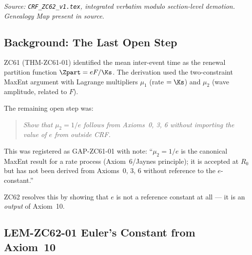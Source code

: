 \documentclass[12pt, a4paper]{article}
\begin{document}
\noindent
\textit{Source: \texttt{CRF\_ZC62\_v1.tex}, integrated verbatim modulo
section-level demotion. Genealogy Map present in source.}

\medskip
\subsection{Background: The Last Open Step}
\label{sec:background}

\begin{keybox}[title={What GAP-ZC61-01 Required}]
ZC61 (THM-ZC61-01) identified the mean inter-event time as the
renewal partition function $\Zpart = eF/\Ks$.
The derivation used the two-constraint MaxEnt argument with
Lagrange multipliers $\mu_1$ (rate $= \Ks$) and
$\mu_2$ (wave amplitude, related to $F$).

The remaining open step was:
\begin{quote}
\textit{Show that $\mu_2 = 1/e$ follows from Axioms~0, 3, 6
without importing the value of $e$ from outside CRF.}
\end{quote}

This was registered as GAP-ZC61-01 with note:
``$\mu_2 = 1/e$ is the canonical MaxEnt result for a rate
process (Axiom~6/Jaynes principle); it is accepted at $R_0$
but has not been derived from Axioms~0, 3, 6 without
reference to the $e$-constant.''

ZC62 resolves this by showing that $e$ is not a reference
constant at all --- it is an \emph{output} of Axiom~10.
\end{keybox}

\subsection{LEM-ZC62-01 \quad Euler's Constant from Axiom~10}
\label{sec:lem01}

\end{document}
